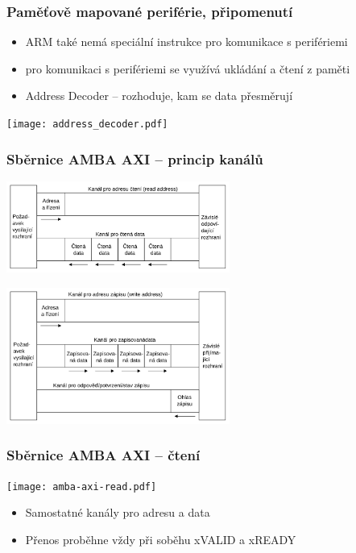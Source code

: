 \documentclass{beamer}
\begin{document}
\begin{frame}
\frametitle{Paměťově mapované periférie, připomenutí}

\begin{itemize}
\item ARM také nemá speciální instrukce pro komunikace s perifériemi
\item pro komunikaci s perifériemi se využívá ukládání a čtení z paměti
\item Address Decoder -- rozhoduje, kam se data přesměrují
\end{itemize}
\begin{center}
\texttt{[image: address\_decoder.pdf]}
\end{center}
\end{frame}

\begin{frame}
\frametitle{Sběrnice AMBA AXI -- princip kanálů}

\begin{center}
\includegraphics[width=0.55\textwidth]{amba-axi-read-concept-cz}
\end{center}

\begin{center}
\includegraphics[width=0.55\textwidth]{amba-axi-write-concept-cz}
\end{center}

\end{frame}

\begin{frame}
\frametitle{Sběrnice AMBA AXI -- čtení}

\begin{center}
\texttt{[image: amba-axi-read.pdf]}
\end{center}

\begin{itemize}
\item Samostatné kanály pro adresu a data
\item Přenos proběhne vždy při soběhu xVALID a xREADY
\end{itemize}

\end{frame}
\end{document}

